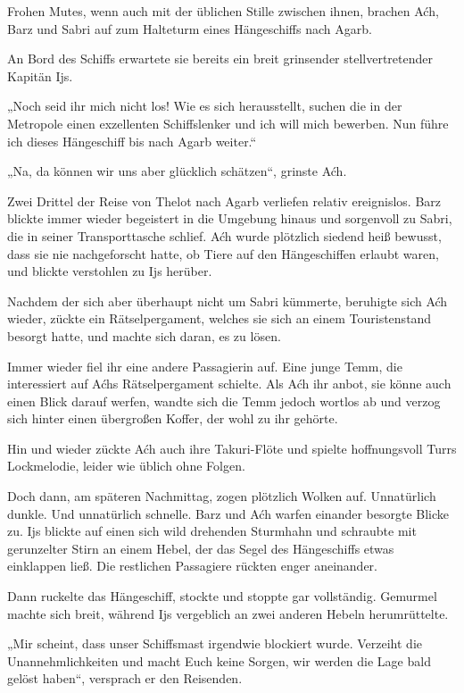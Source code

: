 Frohen Mutes, wenn auch mit der üblichen Stille zwischen ihnen, brachen Aćh, Barz und Sabri auf zum Halteturm eines Hängeschiffs nach Agarb.

An Bord des Schiffs erwartete sie bereits ein breit grinsender stellvertretender Kapitän Ijs.

„Noch seid ihr mich nicht los! Wie es sich herausstellt, suchen die in der Metropole einen exzellenten Schiffslenker und ich will mich bewerben. Nun führe ich dieses Hängeschiff bis nach Agarb weiter.“

„Na, da können wir uns aber glücklich schätzen“, grinste Aćh.



\trennzeichen



Zwei Drittel der Reise von Thelot nach Agarb verliefen relativ ereignislos. Barz blickte immer wieder begeistert in die Umgebung hinaus und sorgenvoll zu Sabri, die in seiner Transporttasche schlief. Aćh wurde plötzlich siedend heiß bewusst, dass sie nie nachgeforscht hatte, ob Tiere auf den Hängeschiffen erlaubt waren, und blickte verstohlen zu Ijs herüber.

Nachdem der sich aber überhaupt nicht um Sabri kümmerte, beruhigte sich Aćh wieder, zückte ein Rätselpergament, welches sie sich an einem Touristenstand besorgt hatte, und machte sich daran, es zu lösen.

Immer wieder fiel ihr eine andere Passagierin auf. Eine junge Temm, die interessiert auf Aćhs Rätselpergament schielte. Als Aćh ihr anbot, sie könne auch einen Blick darauf werfen, wandte sich die Temm jedoch wortlos ab und verzog sich hinter einen übergroßen Koffer, der wohl zu ihr gehörte.

Hin und wieder zückte Aćh auch ihre Takuri-Flöte und spielte hoffnungsvoll Turrs Lockmelodie, leider wie üblich ohne Folgen.

Doch dann, am späteren Nachmittag, zogen plötzlich Wolken auf. Unnatürlich dunkle. Und unnatürlich schnelle. Barz und Aćh warfen einander besorgte Blicke zu. Ijs blickte auf einen sich wild drehenden Sturmhahn und schraubte mit gerunzelter Stirn an einem Hebel, der das Segel des Hängeschiffs etwas einklappen ließ. Die restlichen Passagiere rückten enger aneinander.

Dann ruckelte das Hängeschiff, stockte und stoppte gar vollständig. Gemurmel machte sich breit, während Ijs vergeblich an zwei anderen Hebeln herumrüttelte.

„Mir scheint, dass unser Schiffsmast irgendwie blockiert wurde. Verzeiht die Unannehmlichkeiten und macht Euch keine Sorgen, wir werden die Lage bald gelöst haben“, versprach er den Reisenden.

